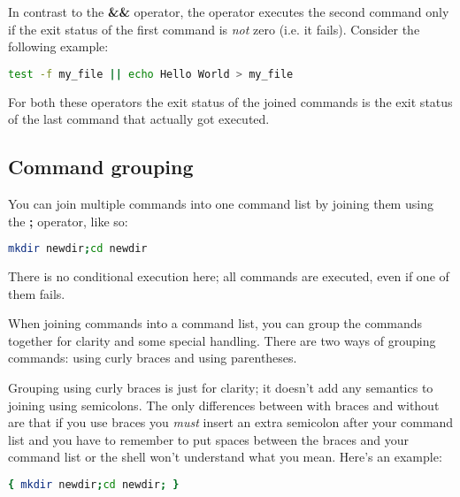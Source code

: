 In contrast to the \textbf{\&\&} operator, the \textbf{\textbar{}\textbar{}}
operator executes the second command only if the exit status of the first
command is \emph{not} zero (i.e. it fails). Consider the following example:
\lstset{basicstyle=\scriptsize, numbers=left, captionpos=b, tabsize=4}
\begin{lstlisting}[caption=Make sure we do not overwrite a file; create a new file only if it doesn't exist yet,language={bash},
breaklines=true,xleftmargin=15pt,label=lst:Make sure we do not overwrite a file; create a new file only if it doesn't exist yet]
test -f my_file || echo Hello World > my_file
\end{lstlisting}

For both these operators the exit status of the joined commands is the exit
status of the last command that actually got executed.

\subsection{Command grouping}
You can join multiple commands into one command list by joining them using the
\textbf{;} operator, like so:
\lstset{basicstyle=\scriptsize, numbers=left, captionpos=b, tabsize=4}
\begin{lstlisting}[caption=Create a directory and change into it all in one go,language={bash},
breaklines=true,xleftmargin=15pt,label=lst:Create a directory and change into it all in one go]
mkdir newdir;cd newdir
\end{lstlisting}

There is no conditional execution here; all commands are executed, even if one
of them fails.

When joining commands into a command list, you can group the commands together
for clarity and some special handling. There are two ways of grouping commands:
using curly braces and using parentheses.

Grouping using curly braces is just for clarity; it doesn't add any semantics
to joining using semicolons. The only differences between with braces and
without are that if you use braces you \emph{must} insert an extra semicolon
after your command list and you have to remember to put spaces between the
braces and your command list or the shell won't understand what you mean.
Here's an example:
\lstset{basicstyle=\scriptsize, numbers=left, captionpos=b, tabsize=4}
\begin{lstlisting}[caption=Create a directory and change into it all in one go grouped with curly braces,language={bash},
breaklines=true,xleftmargin=15pt,label=lst:Create a directory and change into it all in one go grouped with curly braces]
{ mkdir newdir;cd newdir; }
\end{lstlisting}

